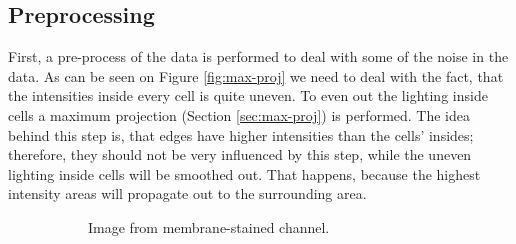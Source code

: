 \documentclass[
  digital,     %
  oneside,     %
  nosansbold,  %
  nocolorbold, %
  lof,         %
  lot,         %
]{fithesis4}
\begin{document}
\subsection*{Preprocessing}
First, a pre-process of the data is performed to deal with some of the noise in
the data. As can be seen on Figure \ref{fig:max-proj} we need to deal with the
fact, that the intensities inside every cell is quite uneven. To even out the
lighting inside cells a maximum projection (Section \ref{sec:max-proj}) is
performed. The idea behind this step is, that edges have higher intensities than
the cells' insides; therefore, they should not be very influenced by this step,
while the uneven lighting inside cells will be smoothed out. That happens,
because the highest intensity areas will propagate out to the surrounding area.

\begin{figure}
    \begin{subfigure}[t]{0.45\textwidth}
        \centering
        \caption{Image from membrane-stained channel.}
    \end{subfigure}
    \begin{subfigure}[t]{0.45\linewidth}
        \centering

\end{subfigure}
\end{figure}
\end{document}
